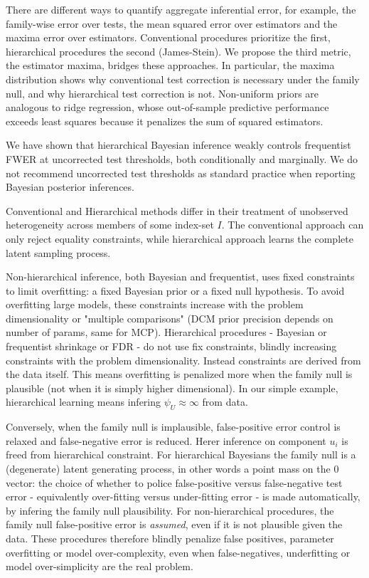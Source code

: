 \documentclass{article}
\begin{document}
 
There are different ways to quantify aggregate inferential error, for example, the family-wise error over tests, the mean squared error over estimators and the maxima error over estimators. Conventional procedures prioritize the first, hierarchical procedures the second (James-Stein). We propose the third metric, the estimator maxima, bridges these approaches. In particular, the maxima distribution shows why conventional test correction is necessary under the family null, and why hierarchical test correction is not. Non-uniform priors are analogous to ridge regression, whose out-of-sample predictive performance exceeds least squares because it penalizes the sum of squared estimators.

We have shown that hierarchical Bayesian inference weakly controls frequentist FWER at uncorrected test thresholds, both conditionally and marginally. We do not recommend uncorrected test thresholds as standard practice when reporting Bayesian posterior inferences.

Conventional and Hierarchical methods differ in their treatment of unobserved heterogeneity across members of some index-set $I$. The conventional approach can only reject equality constraints, while hierarchical approach learns the complete latent sampling process.

Non-hierarchical inference, both Bayesian and frequentist, uses fixed constraints to limit overfitting: a fixed Bayesian prior or a fixed null hypothesis. To avoid overfitting large models, these constraints increase with the problem dimensionality or "multiple comparisons" (DCM prior precision depends on number of params, same for MCP). Hierarchical procedures - Bayesian or frequentist shrinkage or FDR - do not use fix constraints, blindly increasing constraints with the problem dimensionality. Instead constraints are derived from the data itself. This means overfitting is penalized more when the family null is plausible  (not when it is simply higher dimensional). In our simple example, hierarchical learning means infering $\psi_U \approx \infty$ from data. 

Conversely, when the family null is implausible, false-positive error control is relaxed and false-negative error is reduced. Herer inference on component $u_i$ is freed from hierarchical constraint. For hierarchical Bayesians the family null is a (degenerate) latent generating process, in other words a point mass on the $0$ vector: the choice of whether to police false-positive versus false-negative test error - equivalently over-fitting versus under-fitting error - is made automatically, by infering the family null plausibility. For non-hierarchical procedures, the family null false-positive error is \textit{assumed}, even if it is not plausible given the data. These procedures therefore blindly penalize false positives, parameter overfitting or model over-complexity, even when false-negatives, underfitting or model over-simplicity are the real problem.
\end{document}
